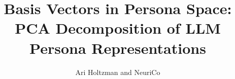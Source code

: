\documentclass{article}
\title{Basis Vectors in Persona Space:\\PCA Decomposition of LLM Persona Representations}
\author{Ari Holtzman and NeuriCo}
\begin{document}
\maketitle

\begin{abstract}

\end{abstract}










\end{document}
